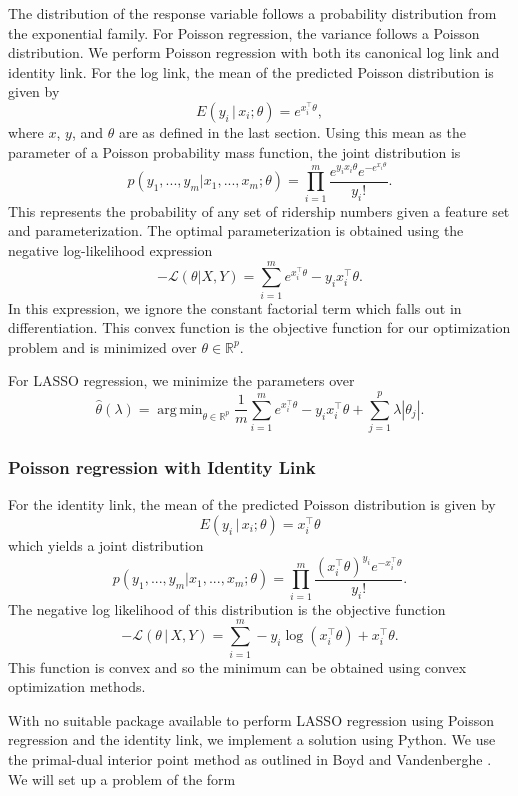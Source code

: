 \documentclass[11pt]{article}
\DeclareMathOperator*{\argmin}{arg\,min}
\begin{document}
The distribution of the response variable follows a probability distribution from the exponential family. For Poisson regression, the variance follows a Poisson distribution. We perform Poisson regression with both its canonical log link and identity link. For the log link, the mean of the predicted Poisson distribution is given by 
\[E(y_i\,|\,x_i;\theta) = e^{x_i^\top\theta},\]
where $x$, $y$, and $\theta$ are as defined in the last section. 
Using this mean as the parameter of a Poisson probability mass function, the joint distribution is
\[p(y_1, ..., y_m|x_1, ..., x_m; \theta) = \prod_{i=1}^m \frac{e^{y_ix_i\theta}e^{-e^{x_i\theta}}}{y_i!}.\]
This represents the probability of any set of ridership numbers given a feature set and parameterization. The optimal parameterization is obtained using the negative log-likelihood expression
\[-\mathcal{L}(\theta|X, Y) = \sum_{i=1}^m e^{x_i^\top\theta}-y_ix_i^\top\theta. \]
In this expression, we ignore the constant factorial term which falls out in differentiation. This convex function is the objective function for our optimization problem and is minimized over $\theta\in\mathbb{R}^p$.

For LASSO regression, we minimize the parameters \cite{Young2007} over  
\[\hat{\theta}(\lambda) = \argmin_{\theta\in\mathbb{R}^p}  \frac{1}{m}\sum_{i=1}^m e^{x_i^\top\theta}-y_ix_i^\top\theta  + \sum_{j=1}^p\lambda\left|\theta_j\right|.\]

\subsubsection{Poisson regression with Identity Link}

For the identity link, the mean of the predicted Poisson distribution is given by $$E(y_i\,|\,x_i;\theta) = x_i^\top\theta$$ which yields a joint distribution 
$$p(y_1,...,y_m|x_1,...,x_m;\theta) = \prod_{i=1}^m \frac{\left(x_i^\top\theta\right)^{y_i}e^{-x_i^\top\theta}}{y_i!}. $$
The negative log likelihood of this distribution is the objective function
\begin{equation}-\mathcal{L}\left(\theta\,|\,X, Y\right) = \sum_{i=1}^m -y_i\log{\left(x_i^\top\theta\right)} +x_i^\top\theta. \label{eq:piloglik}\end{equation} This function is convex and so the minimum can be obtained using convex optimization methods. 

With no suitable package available to perform LASSO regression using Poisson regression and the identity link, we implement a solution using Python. We use the primal-dual interior point method as outlined in Boyd and Vandenberghe \cite{Boyd2004}. We will set up a problem of the form 
\end{document}
